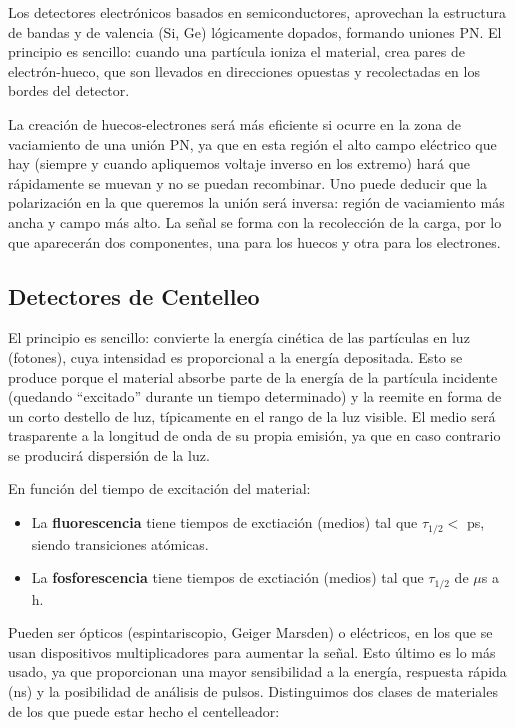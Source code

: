 Los detectores electrónicos basados en semiconductores, aprovechan la estructura de bandas y de valencia (Si, Ge) lógicamente dopados, formando uniones PN. El principio es sencillo: cuando una partícula ioniza el material, crea pares de electrón-hueco, que son llevados en direcciones opuestas y recolectadas en los bordes del detector. 

La creación de huecos-electrones será más eficiente si ocurre en la zona de vaciamiento de una unión PN, ya que en esta región el alto campo eléctrico que hay (siempre y cuando apliquemos voltaje inverso en los extremo) hará que rápidamente se muevan y no se puedan recombinar. Uno puede deducir que la polarización en la que queremos la unión será inversa: región de vaciamiento más ancha y campo más alto. La señal se forma con la recolección de la carga, por lo que aparecerán dos componentes, una para los huecos y otra para los electrones. 


\subsection{Detectores de Centelleo}

El principio es sencillo: convierte la energía cinética de las partículas en luz (fotones), cuya intensidad es proporcional a la energía depositada.  Esto se produce porque el material absorbe parte de la energía de la partícula incidente (quedando ``excitado'' durante un tiempo determinado) y la reemite en forma de un corto destello de luz, típicamente en el rango de la luz visible. El medio será trasparente a la longitud de onda de su propia emisión, ya que en caso contrario se producirá dispersión de la luz. 


En función del tiempo de excitación del material:

\begin{itemize}
    \item La \textbf{fluorescencia} tiene tiempos de exctiación (medios) tal que $\tau_{1/2} <$ ps, siendo transiciones atómicas.
    \item La \textbf{fosforescencia} tiene tiempos de exctiación (medios) tal que $\tau_{1/2}$ de $\mu$s a h.
\end{itemize}
Pueden ser ópticos (espintariscopio, Geiger Marsden) o eléctricos, en los que se usan dispositivos multiplicadores para aumentar la señal. Esto último es lo más usado, ya que proporcionan una mayor sensibilidad a la energía, respuesta rápida (ns) y la posibilidad de análisis de pulsos. Distinguimos dos clases de materiales de los que puede estar hecho el centelleador:

